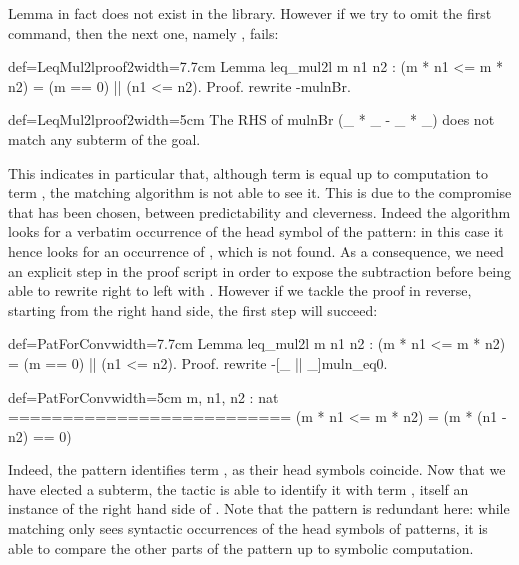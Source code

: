 Lemma  in fact does not exist in the library.%
However if we
try to omit the first  command, then the next one,
namely , fails:

\begin{coq}{def=LeqMul2lproof2}{width=7.7cm}
Lemma leq_mul2l m n1 n2 :
(m * n1 <= m * n2) = (m == 0) || (n1 <= n2).
Proof.
rewrite -mulnBr.
\end{coq}
\begin{coqout}{def=LeqMul2lproof2}{width=5cm}
The RHS of mulnBr
  (_ * _ - _ * _)
does not match any subterm
of the goal.
\end{coqout}

This indicates in particular that, although term 
is equal up to computation to term , the matching
algorithm is not able to see it. This is due to the compromise that
has been chosen, between predictability and cleverness. Indeed the
algorithm looks for a verbatim occurrence of the head symbol of the
pattern: in this case it hence looks for an occurrence of \C{(_ - _)},
which is not found. As a consequence, we need an explicit step in the
proof script in order to expose the subtraction before being able to
rewrite right to left with . However if we tackle the proof
in reverse, starting from the right hand side, the first 
step will succeed:

\begin{coq}{def=PatForConv}{width=7.7cm}
Lemma leq_mul2l m n1 n2 :
(m * n1 <= m * n2) = (m == 0) || (n1 <= n2).
Proof.
rewrite -[_ || _]muln_eq0.
\end{coq}
\begin{coqout}{def=PatForConv}{width=5cm}
m, n1, n2 : nat
==========================
(m * n1 <= m * n2) =
  (m * (n1 - n2) == 0)
\end{coqout}

Indeed, the \C{[_ || _]} pattern identifies term , as
their head symbols coincide. Now that we have elected a subterm, the
 tactic is able to identify it with term
, itself an instance of the right hand side
of . Note that the \C{[_ || _]} pattern is redundant here:
while matching only sees syntactic occurrences of the
head symbols of patterns, it is able to compare the other parts of the
pattern up to symbolic computation.

